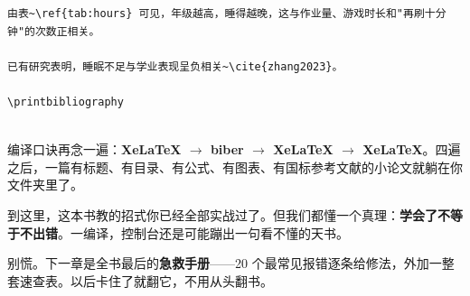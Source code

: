 \begin{lstlisting}
由表~\ref{tab:hours} 可见，年级越高，睡得越晚，这与作业量、游戏时长和"再刷十分钟"的次数正相关。

已有研究表明，睡眠不足与学业表现呈负相关~\cite{zhang2023}。

\printbibliography


\end{lstlisting}

编译口诀再念一遍：\textbf{XeLaTeX \ensuremath{\rightarrow} biber \ensuremath{\rightarrow} XeLaTeX \ensuremath{\rightarrow} XeLaTeX}。四遍之后，一篇有标题、有目录、有公式、有图表、有国标参考文献的小论文就躺在你文件夹里了。

到这里，这本书教的招式你已经全部实战过了。但我们都懂一个真理：\textbf{学会了不等于不出错}。一编译，控制台还是可能蹦出一句看不懂的天书。

别慌。下一章是全书最后的\textbf{急救手册}——20 个最常见报错逐条给修法，外加一整套速查表。以后卡住了就翻它，不用从头翻书。
